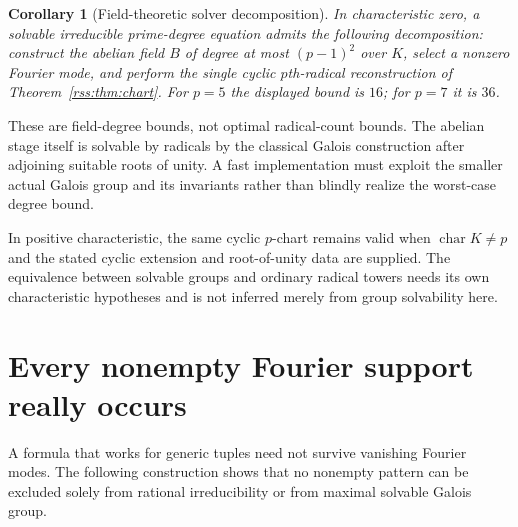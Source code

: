 \documentclass[11pt,a4paper]{article}
\newtheorem{corollary}[theorem]{Corollary}
\theoremstyle{definition}
\theoremstyle{remark}
\newcommand{\charac}{\operatorname{char}}
\begin{document}
\begin{corollary}[Field-theoretic solver decomposition]\label{rss:cor:tower}
In characteristic zero, a solvable irreducible prime-degree equation admits
the following decomposition: construct the abelian field $B$ of degree at
most $(p-1)^2$ over $K$, select a nonzero Fourier mode, and perform the
single cyclic $p$th-radical reconstruction of Theorem~\ref{rss:thm:chart}.
For $p=5$ the displayed bound is $16$; for $p=7$ it is $36$.
\end{corollary}

These are field-degree bounds, not optimal radical-count bounds. The
abelian stage itself is solvable by radicals by the classical Galois
construction after adjoining suitable roots of unity. A fast implementation
must exploit the smaller actual Galois group and its invariants rather than
blindly realize the worst-case degree bound.

In positive characteristic, the same cyclic $p$-chart remains valid when
$\charac K\neq p$ and the stated cyclic extension and root-of-unity data
are supplied. The equivalence between solvable groups and ordinary radical
towers needs its own characteristic hypotheses and is not inferred merely
from group solvability here.

\section{Every nonempty Fourier support really occurs}
\label{rss:sec:support}

A formula that works for generic tuples need not survive vanishing Fourier
modes. The following construction shows that no nonempty pattern can be
excluded solely from rational irreducibility or from maximal solvable
Galois group.
\end{document}
